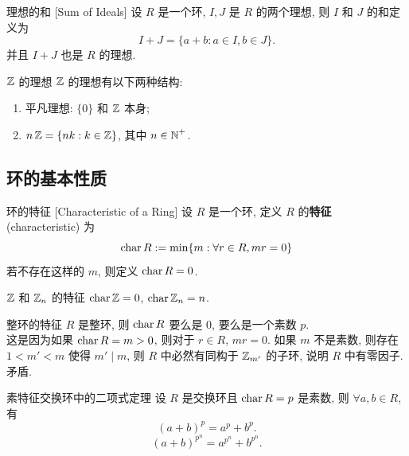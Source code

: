         \begin{xmp}
            {理想的和}
            [Sum of Ideals]
            设 \(R\) 是一个环, \(I,J\) 是 \(R\) 的两个理想, 则 \(I\) 和 \(J\) 的和定义为
            \[I+J=\{a+b: a\in I, b\in J\}.\]
            并且 \(I+J\) 也是 \(R\) 的理想.
        \end{xmp}

        \begin{ins}
            {\(\operatorname{\mathbb{Z}}\) 的理想}
            \(\operatorname{\mathbb{Z}}\) 的理想有以下两种结构:
            \begin{enumerate}
                \item 平凡理想: \(\{0\}\) 和 \(\operatorname{\mathbb{Z}}\) 本身;
                \item \(n\operatorname{\mathbb{Z}}=\{nk: k\in\operatorname{\mathbb{Z}}\}\), 其中 \(n\in\operatorname{\mathbb{N}}^+\).
            \end{enumerate}
        \end{ins}

    \subsection{环的基本性质}

        \begin{dfn}
            [Characteristic]
            {环的特征}
            [Characteristic of a Ring]
            设 \(R\) 是一个环, 定义 \(R\) 的\textbf{特征} (characteristic) 为
            \[\operatorname{char} R:=\min\{m: \forall r\in R, mr=0\}\]
            若不存在这样的 \(m\), 则定义 \(\operatorname{char} R=0\).
        \end{dfn}

        \begin{ins}
            {\(\operatorname{\mathbb{Z}}\) 和 \(\operatorname{\mathbb{Z}}_n\) 的特征}
            \(\operatorname{char} \operatorname{\mathbb{Z}}=0\), \(\operatorname{char} \operatorname{\mathbb{Z}}_n=n\).
        \end{ins}

        \begin{ppt}
            {整环的特征}
            \(R\) 是整环, 则 \(\operatorname{char} R\) 要么是 \(0\), 要么是一个素数 \(p\). \\
            这是因为如果 \(\operatorname{char} R=m>0\), 则对于 \(r\in R\), \(mr=0\). 如果 \(m\) 不是素数, 则存在 \(1<m'<m\) 使得 \(m'\mid m\), 则 \(R\) 中必然有同构于 \(\operatorname{\mathbb{Z}}_{m'}\) 的子环, 说明 \(R\) 中有零因子. 矛盾.
        \end{ppt}

        \begin{thm}
            {素特征交换环中的二项式定理}
            设 \(R\) 是交换环且 \(\operatorname{char} R=p\) 是素数, 则 \(\forall a,b\in R\), 有
            \[(a+b)^p=a^p+b^p.\]
            \[(a+b)^{p^n}=a^{p^n}+b^{p^n}.\]
        \end{thm}

